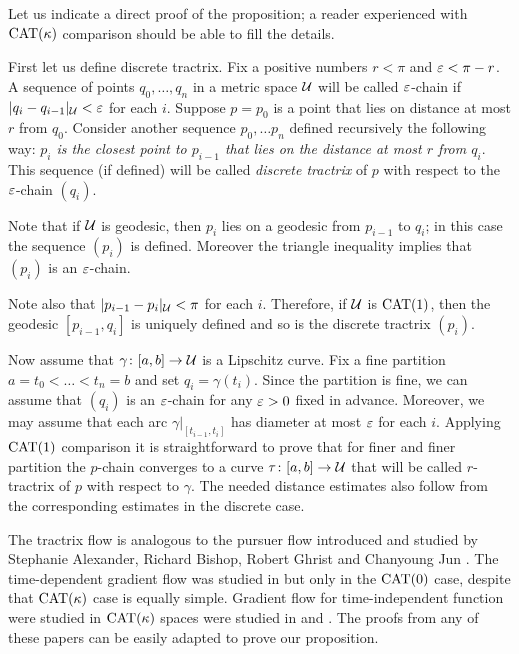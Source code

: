 \documentclass[oneside,a4paper, 12pt]{article}
\begin{document}
Let us indicate a direct proof of the proposition;
a reader experienced with $\mathrm{CAT}(\kappa)$ comparison should be able to fill the details.

First let us define discrete tractrix.
Fix a positive numbers $r<\pi$ and $\varepsilon<\pi-r$. 
A sequence of points $q_0,\dots,q_n$ in a metric space ${\mathcal{U}}$ will be called $\varepsilon$-chain if $|q_i-q_{i-1}|_{\mathcal{U}}<\varepsilon$ for each $i$.
Suppose $p=p_0$ is a point that lies on distance at most $r$ from  $q_0$.
Consider another sequence $p_0,\dots p_n$ defined recursively the following way:
\emph{$p_i$ is the closest point to $p_{i-1}$ that lies on the distance at most $r$ from $q_i$}.
This sequence (if defined) will be called \emph{discrete tractrix} of $p$ with respect to the $\varepsilon$-chain $(q_i)$.

Note that if ${\mathcal{U}}$ is geodesic, then 
$p_i$ lies on a geodesic from $p_{i-1}$ to $q_i$; 
in this case the sequence $(p_i)$ is defined.
Moreover the triangle inequality implies that $(p_i)$ is an $\varepsilon$-chain.

Note also that $|p_{i-1}-p_i|_{\mathcal{U}}<\pi$ for each $i$.
Therefore, if ${\mathcal{U}}$ is $\mathrm{CAT}(1)$, then the geodesic $[p_{i-1},q_i]$ is uniquely defined and 
so is the discrete tractrix $(p_i)$.

Now assume that $\gamma\colon[a,b]\to \mathcal{U}$ is a Lipschitz curve.
Fix a fine partition $a=t_0<\dots<t_n=b$ and set $q_i=\gamma(t_i)$.
Since the partition is fine, we can assume that $(q_i)$ is an $\varepsilon$-chain for any $\varepsilon>0$ fixed in advance.
Moreover, we may assume that each arc $\gamma|_{[t_{i-1},t_i]}$ has diameter at most $\varepsilon$ for each $i$.
Applying $\mathrm{CAT}(1)$ comparison it is straightforward to prove that for finer and finer partition the $p$-chain converges to a curve $\tau\colon[a,b]\to \mathcal{U}$ that will be called $r$-tractrix of $p$ with respect to $\gamma$.
The needed distance estimates also follow from the corresponding estimates in the discrete case.


The tractrix flow is analogous to the pursuer flow introduced and studied by Stephanie Alexander, Richard Bishop, Robert Ghrist and Chanyoung Jun \cite{ABG,jun-thesis,jun,jun:grad}.
The time-dependent gradient flow was studied in \cite{jun-thesis,jun:grad} but only in the $\mathrm{CAT}(0)$ case, despite that $\mathrm{CAT}(\kappa)$ case is equally simple.
Gradient flow for time-independent function were studied in $\mathrm{CAT}(\kappa)$ spaces were studied in \cite{lytchak-open-map} and \cite{ohta-palfia}. 
The proofs from any of these papers can be easily adapted to prove our proposition.
\end{document}
